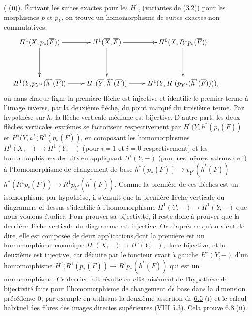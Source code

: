 \documentclass[10pt]{../fichiers-configuration-latex/smfart}
\begin{document}
( (ii)). Écrivant les suites exactes pour les $H^1$, (variantes
de (\hyperref[XII.prop3.2]{3.2})) pour les morphismes $p$ et $p_Y$, on trouve un homomorphisme
de suites exactes non commutatives:
$$
\xymatrix@R=1.5cm{
H^{1} (X,p_{\ast}(\bar{F}))  \ar[r] \ar[d] & H^{1}(\bar{X},\bar{F})  \ar[r]\ar[d] &
H^{0}(X,R^{1}p_{\ast}(\bar{F})) \ar[d]&\\
H^{1}(Y,p_{Y^{\ast}}(\bar{h}^{\ast}(\bar{F})) \ar[r] &
H^{1}(\bar{Y},\bar{h}^{\ast}(\bar{F}))  \ar[r] &
H^{0}(Y,R^{1}(p_{Y^{\ast}}(\bar{h}^{\ast}(\bar{F})))), 
}
$$
où dans chaque ligne la première flèche est injective et identifie le
premier terme à l'image inverse, par la deuxième flèche, du point
marqué du troisième terme. Par hypothèse sur $\bar{h}$, la flèche
verticale médiane est bijective. D'autre part, les deux flèches
verticales extrêmes se factorisent respectivement par
$H^1(Y,h^{\ast}(p_{\ast}(\bar{F}))$ et
$H^{\circ}(Y,h^{\ast}(R^1(p_{\ast}(\bar{F}))$, en composant les
homomorphismes $H^{i}(X,-)\rightarrow H^1(Y,-)$ (pour $i=1$ et $i=0$
respectivement) et les homomorphismes déduits en appliquant
$H^{i}(Y,-)$ (pour ces mêmes valeurs de i) à l'homomorphisme de
changement de base $h^{\ast}(p_{\ast}(\bar{F}))\rightarrow
p_{Y^{\ast}}(\bar{h}^{\ast}(\bar{F}))$ \resp
$h^{\ast}(R^1p_{\ast}(\bar{F}))\rightarrow
R^1p_{Y^{\ast}}(\bar{h}^{\ast}(\bar{F}))$. Comme la première de ces
flèches est un isomorphisme par hypothèse, il s'ensuit que la première
flèche verticale du diagramme ci-dessus s'identifie à l'homomorphisme
$H^1(C,-)\rightarrow H^1(Y,-)$ que nous voulons étudier. Pour prouver
sa bijectivité, il reste donc à prouver que la dernière flèche
verticale du diagramme est injective. Or d'après ce qu'on vient de
dire, elle est composée de deux applications,\pageoriginale dont la
première est un homomorphisme canonique $H^{\circ}(X,-)\rightarrow
H^{\circ}(Y,-)$, donc bijective, et la deuxième est injective, car
déduite par le foncteur exact à gauche $H^{\circ}(Y,-)$ d'un
homomorphisme $H^{\ast}(R^1(p_{\ast}(\bar{F}))\rightarrow
R^1p_{\ast}(\bar{h}^{\ast}(\bar{F}))$ qui est un monomorphisme. Ce
dernier fait résulte en effet aisément de l'hypothèse de bijectivité
faite pour l'homomorphisme de changement de base dans la dimension
précédente 0, par exemple en utilisant la deuxième assertion de \hyperref[XII.prop6.5]{6.5}
(i) et le calcul habituel des fibres des images directes supérieures
(VIII 5.3). Cela prouve \hyperref[XII.prop6.8]{6.8} (ii).
\end{document}
